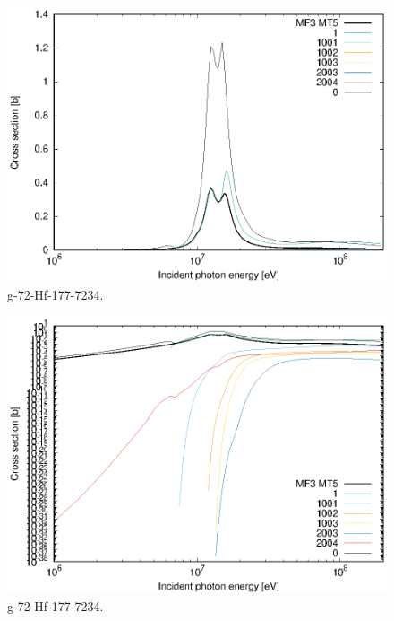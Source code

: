 \begin{figure}
 \includegraphics[width=\linewidth]{eps/g_72-Hf-177_7234.eps}
  \caption{g-72-Hf-177-7234.}
\end{figure}
\begin{figure}
 \includegraphics[width=\linewidth]{eps-log/g_72-Hf-177_7234.eps}
 \caption{g-72-Hf-177-7234.}
\end{figure}
\newpage \clearpage


